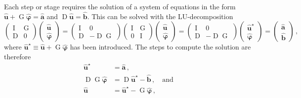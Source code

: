 \documentclass[gmd, manuscript]{copernicus}
\begin{document}
Each step or stage requires the solution of a system of equations in the form \(\boldsymbol{\hat{u}} + \operatorname{G} \boldsymbol{\hat{\varphi}}= \boldsymbol{\hat{a}}\) and \(\operatorname{D} \boldsymbol{\hat{u}} = \boldsymbol{\hat{b}}\).
This can be solved with the LU-decomposition
\begin{equation}
  \begin{pmatrix} \operatorname{I} & \operatorname{G} \\ \operatorname{D} & 0 \end{pmatrix}
  \begin{pmatrix} \boldsymbol{\hat{u}} \\ \boldsymbol{\hat{\varphi}}\end{pmatrix}
    =
  \begin{pmatrix} \operatorname{I} & 0 \\ \operatorname{D} & -\operatorname{D}\operatorname{G} \end{pmatrix}
  \begin{pmatrix} \operatorname{I} & \operatorname{G} \\ 0 & \operatorname{I} \end{pmatrix}
  \begin{pmatrix} \boldsymbol{\hat{u}} \\ \boldsymbol{\hat{\varphi}}\end{pmatrix}
    =
  \begin{pmatrix} \operatorname{I} & 0 \\ \operatorname{D} & -\operatorname{D}\operatorname{G} \end{pmatrix}
  \begin{pmatrix} \boldsymbol{\hat{u}}^\star \\ \boldsymbol{\hat{\varphi}}\end{pmatrix}
  = \begin{pmatrix} \boldsymbol{\hat{a}} \\ \boldsymbol{\hat{b}}\end{pmatrix}
  \,,
\end{equation}
where \(\boldsymbol{\hat{u}}^\star \equiv \boldsymbol{\hat{u}} + \operatorname{G} \boldsymbol{\hat{\varphi}}\) has been introduced.
The steps to compute the solution are therefore
\begin{equation}
\begin{aligned}
  \boldsymbol{\hat{u}}^\star &= \boldsymbol{\hat{a}}
  \,, \\
  \label{eq:projection}
  \operatorname{D} \operatorname{G} \boldsymbol{\hat{\varphi}}&= \operatorname{D} \boldsymbol{\hat{u}}^\star - \boldsymbol{\hat{b}}
  \,, \quad \text{and} \\
  \boldsymbol{\hat{u}} &= \boldsymbol{\hat{u}}^\star - \operatorname{G} \boldsymbol{\hat{\varphi}}
  \,,
\end{aligned}
\end{equation}
\end{document}
